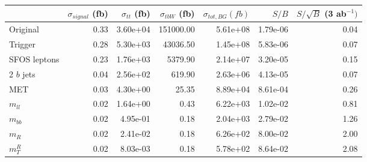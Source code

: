 \begin{tabular}{lrrrrrr}
\toprule
{} &  $\sigma_{signal}$ (fb) &  $\sigma_{tt}$ (fb) &  $\sigma_{tbW}$ (fb) &  $\sigma_{tot, BG} (fb)$ &     $S/B$ &  $S/\sqrt{B}$ (3 ab$^{-1})$ \\
\midrule
Original     &                    0.33 &            3.60e+04 &            151000.00 &                 5.61e+08 &  1.79e-06 &                        0.04 \\
Trigger      &                    0.28 &            5.30e+03 &             43036.50 &                 1.45e+08 &  5.83e-06 &                        0.07 \\
SFOS leptons &                    0.23 &            1.76e+03 &              5379.90 &                 2.14e+07 &  3.20e-05 &                        0.15 \\
2 $b$ jets   &                    0.04 &            2.56e+02 &               619.90 &                 2.63e+06 &  4.13e-05 &                        0.07 \\
MET          &                    0.03 &            4.30e+00 &                25.35 &                 8.89e+04 &  8.61e-04 &                        0.26 \\
$m_{ll}$     &                    0.02 &            1.64e+00 &                 0.43 &                 6.22e+03 &  1.02e-02 &                        0.81 \\
$m_{bb}$     &                    0.02 &            4.95e-01 &                 0.18 &                 2.04e+03 &  2.79e-02 &                        1.26 \\
$m_{R}$      &                    0.02 &            2.41e-02 &                 0.18 &                 6.26e+02 &  8.00e-02 &                        2.00 \\
$m_{T}^{R}$  &                    0.02 &            8.03e-03 &                 0.18 &                 5.78e+02 &  8.64e-02 &                        2.08 \\
\bottomrule
\end{tabular}
